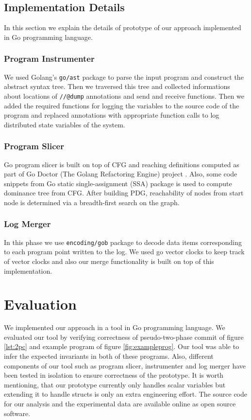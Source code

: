 \subsection{Implementation Details}

In this section we explain the details of prototype of our approach implemented in Go programming language.

\subsubsection{Program Instrumenter}

We used Golang's \texttt{go/ast} package to parse the input program and construct the abstract syntax tree. Then we traversed this tree and collected informations about locations of \texttt{//@dump} annotations and send and receive functions. Then we added the required functions for logging the variables to the source code of the program and replaced annotations with appropriate function calls to log distributed state variables of the system. 

\subsubsection{Program Slicer}

Go program slicer is built on top of CFG and reaching definitions computed as part of Go Doctor (The Golang Refactoring Engine) project \cite{godoctor}. Also, some code snippets from Go static single-assignment (SSA) package \cite{ssa} is used to compute dominance tree from CFG. After building PDG, reachability of nodes from start node is determined via a breadth-first search on the graph.

\subsubsection{Log Merger}

In this phase we use \texttt{encoding/gob} package to decode data items corresponding to each program point written to the log. We used go vector clocks \cite{vclock} to keep track of vector clocks and also our merge functionality is built on top of this implementation. 


\section{Evaluation}
We implemented our approach in a tool in Go programming language. We evaluated our tool by verifying correctness of pseudo-two-phase commit of figure \ref{lst:2pc} and example program of figure \ref{fig:exampleprog}. Our tool was able to infer the expected invariants in both of these programs. Also, different components of our tool such as program slicer, instrumenter and log merger have been tested in isolation to ensure correctness of the prototype. It is worth mentioning, that our prototype currently only handles scalar variables but extending it to handle structs is only an extra engineering effort. The source code for our analysis and the experimental data are available online\cite{distproject} as open source software.


